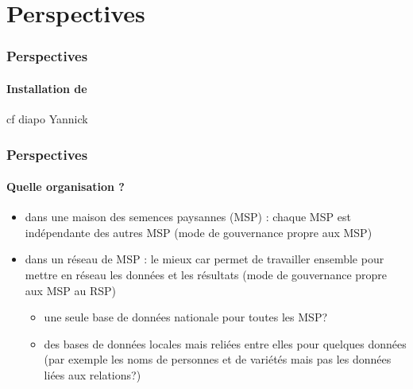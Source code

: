 \section{Perspectives}
\begin{frame}\small\tableofcontents[currentsection,currentsubsection,subsectionstyle=show/show/hide]\end{frame}



\begin{frame}
\frametitle{Perspectives}
\framesubtitle{Installation de \BDD}

cf diapo Yannick








\end{frame}



\begin{frame}
\frametitle{Perspectives}
\framesubtitle{Quelle organisation ?}

\begin{itemize}
\item dans une maison des semences paysannes (MSP) : chaque MSP est indépendante des autres MSP (mode de gouvernance propre aux MSP)
\item dans un réseau de MSP : le mieux car permet de travailler ensemble pour mettre en réseau les données et les résultats (mode de gouvernance propre aux MSP  au RSP)
\begin{itemize}
\item une seule base de données nationale pour toutes les MSP?
\item des bases de données locales mais reliées entre elles pour quelques données (par exemple les noms de personnes et de variétés mais pas les données liées aux relations?)
\end{itemize}
\end{itemize}

\end{frame}



